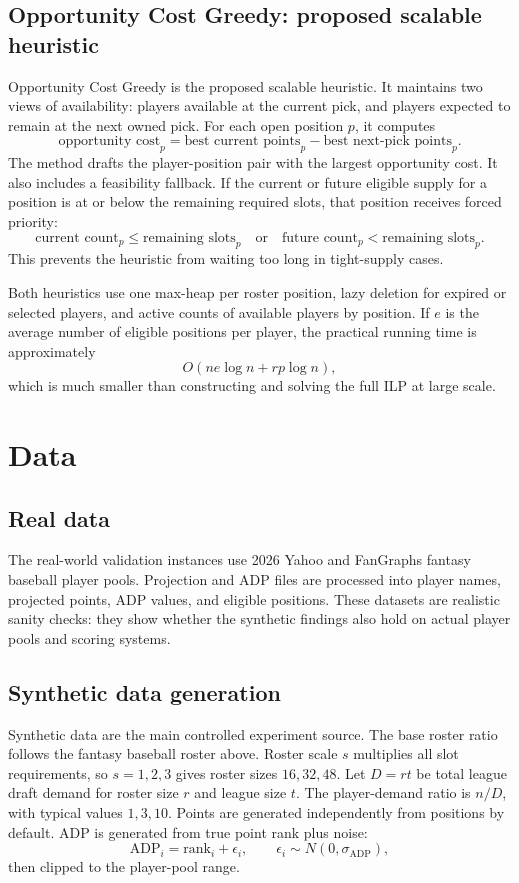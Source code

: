 \documentclass[12pt]{article}
\begin{document}
\subsection{Opportunity Cost Greedy: proposed scalable heuristic}
Opportunity Cost Greedy is the proposed scalable heuristic. It maintains two views of availability: players available at the current pick, and players expected to remain at the next owned pick. For each open position \(p\), it computes
\[
\text{opportunity cost}_p
= \text{best current points}_p-\text{best next-pick points}_p.
\]
The method drafts the player-position pair with the largest opportunity cost. It also includes a feasibility fallback. If the current or future eligible supply for a position is at or below the remaining required slots, that position receives forced priority:
\[
\text{current count}_p\le \text{remaining slots}_p
\quad \text{or} \quad
\text{future count}_p< \text{remaining slots}_p.
\]
This prevents the heuristic from waiting too long in tight-supply cases.

Both heuristics use one max-heap per roster position, lazy deletion for expired or selected players, and active counts of available players by position. If \(e\) is the average number of eligible positions per player, the practical running time is approximately
\[
O(ne\log n+rp\log n),
\]
which is much smaller than constructing and solving the full ILP at large scale.

\section{Data}
\subsection{Real data}
The real-world validation instances use 2026 Yahoo and FanGraphs fantasy baseball player pools. Projection and ADP files are processed into player names, projected points, ADP values, and eligible positions. These datasets are realistic sanity checks: they show whether the synthetic findings also hold on actual player pools and scoring systems.

\subsection{Synthetic data generation}
Synthetic data are the main controlled experiment source. The base roster ratio follows the fantasy baseball roster above. Roster scale \(s\) multiplies all slot requirements, so \(s=1,2,3\) gives roster sizes \(16,32,48\). Let \(D=rt\) be total league draft demand for roster size \(r\) and league size \(t\). The player-demand ratio is \(n/D\), with typical values \(1,3,10\). Points are generated independently from positions by default. ADP is generated from true point rank plus noise:
\[
\text{ADP}_i=\text{rank}_i+\epsilon_i,\qquad \epsilon_i\sim N(0,\sigma_{\text{ADP}}),
\]
then clipped to the player-pool range.
\end{document}
